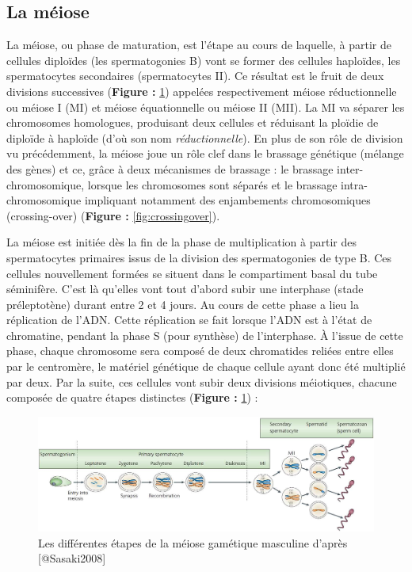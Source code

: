\documentclass[12pt,twoside]{reedthesis}
\theoremstyle{definition}
\theoremstyle{definition}
\theoremstyle{remark}
\begin{document}
  \newpage 
  
  \hypertarget{meiose}{\subsection{La méiose}\label{meiose}}
  
  La méiose, ou phase de maturation, est l'étape au cours de laquelle, à
  partir de cellules diploïdes (les spermatogonies B) vont se former des
  cellules haploïdes, les spermatocytes secondaires (spermatocytes II). Ce
  résultat est le fruit de deux divisions successives (\textbf{Figure :
  }\ref{fig:meiose}) appelées respectivement méiose réductionnelle ou
  méiose I (MI) et méiose équationnelle ou méiose II (MII). La MI va
  séparer les chromosomes homologues, produisant deux cellules et
  réduisant la ploïdie de diploïde à haploïde (d'où son nom
  \emph{réductionnelle}). En plus de son rôle de division vu précédemment,
  la méiose joue un rôle clef dans le brassage génétique (mélange des
  gènes) et ce, grâce à deux mécanismes de brassage : le brassage
  inter-chromosomique, lorsque les chromosomes sont séparés et le brassage
  intra-chromosomique impliquant notamment des enjambements chromosomiques
  (crossing-over) (\textbf{Figure : }\ref{fig:crossingover}).
  
  La méiose est initiée dès la fin de la phase de multiplication à partir
  des spermatocytes primaires issus de la division des spermatogonies de
  type B. Ces cellules nouvellement formées se situent dans le
  compartiment basal du tube séminifère. C'est là qu'elles vont tout
  d'abord subir une interphase (stade préleptotène) durant entre 2 et 4
  jours. Au cours de cette phase a lieu la réplication de l'ADN. Cette
  réplication se fait lorsque l'ADN est à l'état de chromatine, pendant la
  phase S (pour synthèse) de l'interphase. À l'issue de cette phase,
  chaque chromosome sera composé de deux chromatides reliées entre elles
  par le centromère, le matériel génétique de chaque cellule ayant donc
  été multiplié par deux. Par la suite, ces cellules vont subir deux
  divisions méiotiques, chacune composée de quatre étapes distinctes
  (\textbf{Figure : }\ref{fig:meiose}) :
  
  \begin{figure}
  
  {\centering \includegraphics[scale=0.33]{figure/Meiosis_Stages} 
  
  }
  
  \caption[Les différentes étapes de la méiose gamétique masculine]{Les différentes étapes de la méiose gamétique masculine d'après [@Sasaki2008]}\label{fig:meiose}
  \end{figure}
  
\end{document}

